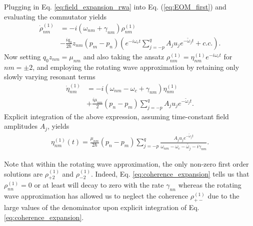 \documentclass[journal]{IEEEtran}
\begin{document}
Plugging in Eq. \ref{eq:field_expansion_rwa} into Eq. (\ref{eq:EOM_first}) and evaluating the commutator yields
\begin{align}
\label{eq:coherence_expansion}
\dot{\rho}_{nm}^{(1)} &= -i(\omega_{nm}+\gamma_{nm})\rho_{nm}^{(1)}  \nonumber \\ 
&- \frac{iq_0}{2\hbar}z_{nm}(p_m-p_n)(e^{-i\omega_c t}\sum_{j=-p}^{q}A_ju_je^{-\tilde\omega_j t} + c.c.).
\end{align}
Now setting $q_0z_{nm} = \mu_{nm}$ and also taking the ansatz $\rho_{nm}^{(1)} = \eta_{nm}^{(1)}e^{-i\omega_c t}$ for $nm = \pm2$, and employing the rotating wave approximation by retaining only slowly varying resonant terms
\begin{align}
\dot{\eta}_{nm}^{(1)} &= -i(\omega_{nm}-\omega_c+\gamma_{nm})\eta_{nm}^{(1)}  \nonumber \\ 
& + \frac{i\mu_{nm}}{2}(p_n-p_m)\sum_{j=-p}^{q}A_ju_je^{-\tilde\omega_j t}.
\end{align}
Explicit integration of the above expression, assuming time-constant field amplitudes $A_j$, yields
\begin{align}
\label{eq:nm_1_final}
\eta_{nm}^{(1)}(t)= \frac{\mu_{nm}}{2\hbar}(p_n-p_m) \sum_{j=-p}^{q}\frac{A_ju_je^{-\tilde\omega_j t}}{\omega_{nm}-\omega_c-\tilde{\omega_j}-i\gamma_{nm}}.
\end{align}

Note that within the rotating wave approximation, the only non-zero first order solutions are $\rho_{+2}^{(1)}$ and $\rho_{-2}^{(1)}$. Indeed, Eq. \ref{eq:coherence_expansion} tells us that $\rho_{nn}^{(1)} = 0 $ or at least will decay to zero with the rate $\gamma_{nn}$ whereas the rotating wave approximation has allowed us to neglect the coherence $\rho_{+-}^{(1)}$ due to the large values of the denominator upon explicit integration of Eq. \ref{eq:coherence_expansion}.  
\end{document}
